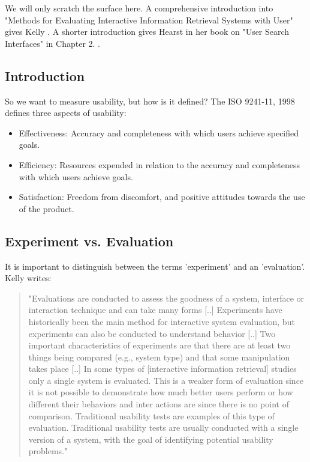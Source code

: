 \documentclass[11pt]{report}
\begin{document}
{{We will only scratch the surface here. A comprehensive introduction into "Methods for Evaluating Interactive Information Retrieval Systems with User" gives Kelly \cite{Kelly2007}. A shorter introduction gives Hearst in her book on "User Search Interfaces" in Chapter 2. \cite{Hearst2009}.\\


\subsection{Introduction}

So we want to measure usability, but how is it defined? The ISO 9241-11, 1998 \cite{ISO} defines three aspects of usability:
\begin{itemize}
	\item Effectiveness: Accuracy and completeness with which users achieve specified goals.
	\item Efficiency: Resources expended in relation to the accuracy and completeness with which users achieve goals.
	\item Satisfaction: Freedom from discomfort, and positive attitudes towards the use of the product.
\end{itemize}

\subsection{Experiment vs. Evaluation}

It is important to distinguish between the terms 'experiment' and an 'evaluation'. Kelly \cite{Kelly2007} writes:
\begin{quote}
"Evaluations are conducted to assess the goodness of a system, interface or interaction technique and can take many forms [..] Experiments have historically been the main method for interactive system evaluation, but experiments can also be conducted to understand behavior [..] Two important characteristics of experiments are that there are at least two things being compared (e.g., system type) and that some manipulation takes place [..] In some types of [interactive information retrieval] studies only a single system is evaluated. This is a weaker form of evaluation since it is not possible to demonstrate how much better users perform or how different their behaviors and inter actions are since there is no point of comparison. Traditional usability tests are examples of this type of evaluation. Traditional usability tests are usually conducted with a single version of a system, with the goal of identifying potential usability problems."	
\end{quote}

}}
\end{document}
